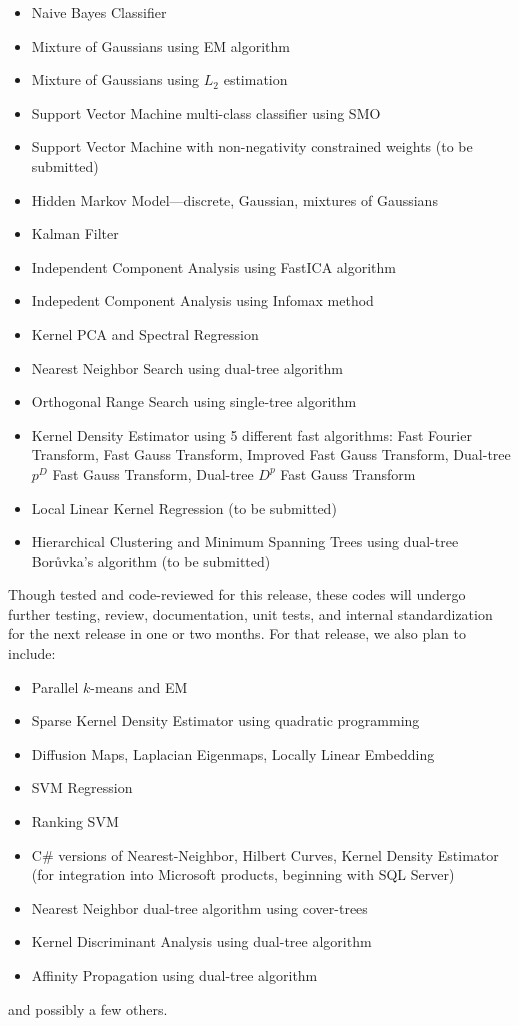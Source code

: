 \documentclass[letter]{report}
\begin{document}
\begin{enumerate}
  \begin{itemize}
  \item Naive Bayes Classifier
  \item Mixture of Gaussians using EM algorithm
  \item Mixture of Gaussians using $L_2$ estimation
  \item Support Vector Machine multi-class classifier using SMO
  \item Support Vector Machine with non-negativity constrained weights 
        (to be submitted)
  \item Hidden Markov Model---discrete, Gaussian, mixtures of Gaussians
  \item Kalman Filter \cite {kai2000le}
  \item Independent Component Analysis using FastICA algorithm \cite{hyvarinen1999far}
  \item Indepedent Component Analysis using Infomax method \cite{bell95}
  \item Kernel PCA and Spectral Regression
  \item Nearest Neighbor Search using dual-tree algorithm
  \item Orthogonal Range Search using single-tree algorithm
  \item Kernel Density Estimator using 5 different fast algorithms: Fast Fourier Transform, Fast Gauss Transform, Improved Fast Gauss Transform, Dual-tree $p^D$ Fast Gauss Transform, Dual-tree $D^p$ Fast Gauss Transform
  \item Local Linear Kernel Regression (to be submitted)
  \item Hierarchical Clustering and Minimum Spanning Trees using 
        dual-tree Bor\r{u}vka's algorithm (to be submitted)
  \end{itemize}
Though tested and code-reviewed for this release, these codes will undergo further testing, review, documentation, unit tests, and internal standardization for the next release in one or two months.  For that release, we also plan to include:
  \begin{itemize}
  \item Parallel $k$-means and EM
  \item Sparse Kernel Density Estimator using quadratic programming    
  \item Diffusion Maps, Laplacian Eigenmaps, Locally Linear Embedding
  \item SVM Regression
  \item Ranking SVM
  \item C\# versions of Nearest-Neighbor, Hilbert Curves, Kernel Density Estimator (for integration into Microsoft products, beginning with SQL Server)
  \item Nearest Neighbor dual-tree algorithm using cover-trees
  \item Kernel Discriminant Analysis using dual-tree algorithm
  \item Affinity Propagation using dual-tree algorithm
  \end{itemize}
and possibly a few others.


\end{enumerate}
\end{document}
